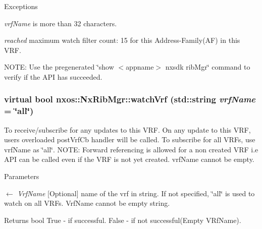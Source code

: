 \begin{DoxyExceptions}{Exceptions}
\item[{\em vrfName}]is more than 32 characters. \item[{\em reached}]maximum watch filter count: 15 for this Address-\/Family(AF) in this VRF.\end{DoxyExceptions}
NOTE: Use the pregenerated \char`\"{}show $<$appname$>$ nxsdk ribMgr\char`\"{} command to verify if the API has succeeded. \hypertarget{classnxos_1_1NxRibMgr_a35e2a52be337d47cd111803f64aca904}{
\subsubsection[{watchVrf}]{\setlength{\rightskip}{0pt plus 5cm}virtual bool nxos::NxRibMgr::watchVrf (std::string {\em vrfName} = {\ttfamily \char`\"{}all\char`\"{}})}}
\label{classnxos_1_1NxRibMgr_a35e2a52be337d47cd111803f64aca904}
To receive/subscribe for any updates to this VRF. On any update to this VRF, users overloaded postVrfCb handler will be called. To subscribe for all VRFs, use vrfName as \char`\"{}all\char`\"{}. NOTE: Forward referencing is allowed for a non created VRF i.e API can be called even if the VRF is not yet created. vrfName cannot be empty. 
\begin{DoxyParams}{Parameters}
\item[\mbox{$\leftarrow$} {\em VrfName}]\mbox{[}Optional\mbox{]} name of the vrf in string. If not specified, \char`\"{}all\char`\"{} is used to watch on all VRFs. VrfName cannot be empty string. \end{DoxyParams}
\begin{DoxyReturn}{Returns}
bool True -\/ if successful. False -\/ if not successful(Empty VRfName).
\end{DoxyReturn}

